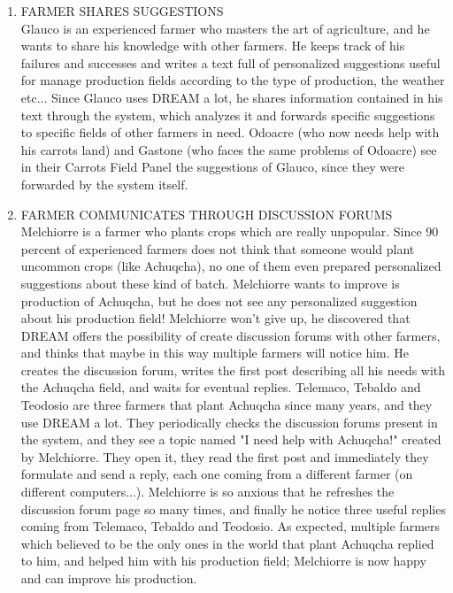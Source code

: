 \begin{enumerate}[label=\textbf{SCENARIO \arabic*}]
			\item \label{sce:sce2} FARMER SHARES SUGGESTIONS \\
			Glauco is an experienced farmer who masters the art of agriculture, and he wants to share his knowledge with other farmers. He keeps track of his failures and successes and writes a text full of personalized suggestions useful for manage production fields according to the type of production, the weather etc...
			Since Glauco uses DREAM a lot, he shares information contained in his text through the system, which analyzes it and forwards specific suggestions to specific fields of other farmers in need.
			Odoacre (who now needs help with his carrots land) and Gastone (who faces the same problems of Odoacre) see in their Carrots Field Panel the suggestions of Glauco, since they were forwarded by the system itself.
			
			\item \label{sce:sce3} FARMER COMMUNICATES THROUGH DISCUSSION FORUMS \\ 
			Melchiorre is a farmer who plants crops which are really unpopular. Since 90 percent of experienced farmers does not think that someone would plant uncommon crops (like Achuqcha), no one of them even prepared personalized suggestions about these kind of batch. Melchiorre wants to improve is production of Achuqcha, but he does not see any personalized suggestion about his production field! 
			Melchiorre won't give up, he discovered that DREAM offers the possibility of create discussion forums with other farmers, and thinks that maybe in this way multiple farmers will notice him.
			He creates the discussion forum, writes the first post describing all his needs with the Achuqcha field, and waits for eventual replies. 
			Telemaco, Tebaldo and Teodosio are three farmers that plant Achuqcha since many years, and they use DREAM a lot. They periodically checks the discussion forums present in the system, and they see a topic named "I need help with Achuqcha!" created by Melchiorre. They open it, they read the first post and immediately they formulate and send a reply, each one coming from a different farmer (on different computers...).
			Melchiorre is so anxious that he refreshes the discussion forum page so many times, and finally he notice three useful replies coming from Telemaco, Tebaldo and Teodosio. As expected, multiple farmers which believed to be the only ones in the world that plant Achuqcha replied to him, and helped him with his production field; Melchiorre is now happy and can improve his production.
			

\end{enumerate}
